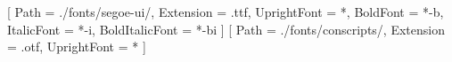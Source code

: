 \setmainfont{segoe-ui}[
    Path = ./fonts/segoe-ui/,
    Extension = .ttf,
    UprightFont = *,
    BoldFont = *-b,
    ItalicFont = *-i,
    BoldItalicFont = *-bi
]
\newfontfamily{}[
    Path = ./fonts/conscripts/,
    Extension = .otf,
    UprightFont = *
]
%
\makeglossaries
